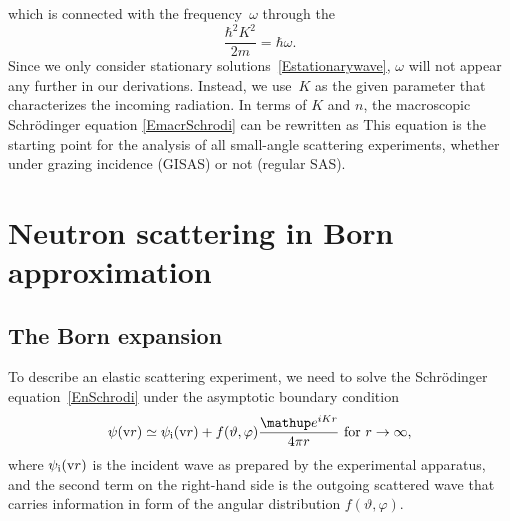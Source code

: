 which is connected with the frequency~$\omega$ through the
\begin{equation}
  \frac{\hbar^2 K^2}{2m} = \hbar\omega.
\end{equation}
Since we only consider stationary solutions~\cref{Estationarywave},
$\omega$ will not appear any further in our derivations.
Instead, we use~$K$ as the given parameter that characterizes the
incoming radiation.
In terms of $K$ and $n$,
the macroscopic Schrödinger equation \cref{EmacrSchrodi}
can be rewritten as
This equation is the starting point for the analysis of all
small-angle scattering experiments,
whether under grazing incidence (GISAS) or not (regular SAS).
%
%

%
%

\section{Neutron scattering in Born approximation}\label{SBornApprox}

\subsection{The Born expansion}\label{SBornExpans}

%

To describe an elastic scattering experiment,
we need to solve the Schrödinger equation~\cref{EnSchrodi}
under the asymptotic boundary condition
\begin{equation}\label{Escabouco}
  \psi(\r)
  \simeq \psi_\ti(\r) + f(\vartheta,\varphi)\frac{\e^{iKr}}{4\pi r}
  \text{~for~}r\to\infty,
\end{equation}
%
%
where $\psi_{\text{i}}(\text{v}{r})$ is the incident wave
as prepared by the experimental apparatus,
and the second term on the right-hand side is
the outgoing scattered wave
that carries information in form of the angular distribution
$f(\vartheta,\varphi)$.

